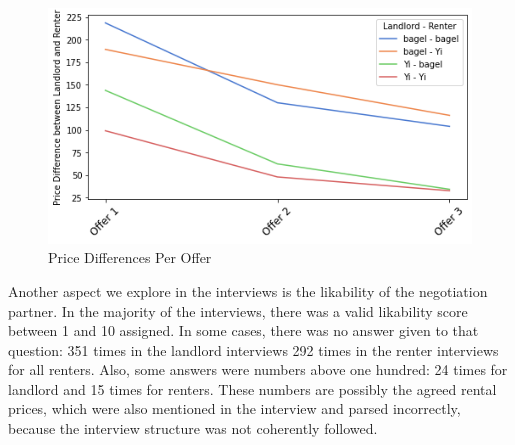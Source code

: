 \documentclass[runningheads]{llncs}
\begin{document}
\begin{figure}[h]
    \includegraphics[width=1\textwidth]{plots/price_differences.png}
    \caption[eval]{Price Differences Per Offer}
    \label{fig:price_diff}
\end{figure}

Another aspect we explore in the interviews is the likability of the negotiation partner. In the majority of the interviews, there was a valid likability score between 1 and 10 assigned. In some cases, there was no answer given to that question: 351 times in the landlord interviews 292 times in the renter interviews for all renters. Also, some answers were numbers above one hundred: 24 times for landlord and 15 times for renters. These numbers are possibly the agreed rental prices, which were also mentioned in the interview and parsed incorrectly, because the interview structure was not coherently followed.
\end{document}
